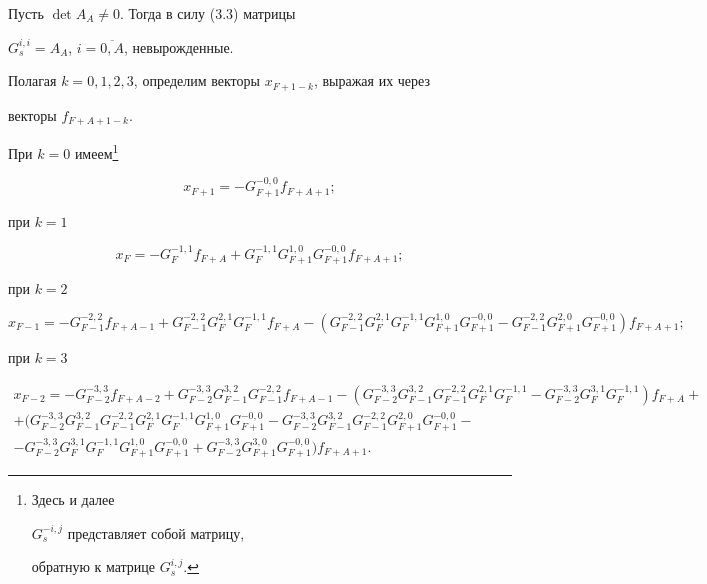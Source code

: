 Пусть $\det A_{A} \neq 0$. Тогда в силу (3.3) матрицы


$G_{s}^{i,i}=A_A$, $i=\overline{0,A}$, невырожденные.


Полагая $k=0,1,2,3$, определим векторы $x_{F+1-k}$, выражая их через


векторы $f_{F+A+1-k}$.





\noindent При $k=0$ имеем\footnote{Здесь и далее


$G_{s}^{-i,j}$ представляет собой матрицу,


обратную к матрице $G_{s}^{i,j}$.}


$$


x_{F+1}=-G_{F+1}^{-0,0}f_{F+A+1};


$$


при $k=1$


$$


x_{F}=-G_{F}^{-1,1}f_{F+A}+G_{F}^{-1,1}G_{F+1}^{1,0}


G_{F+1}^{-0,0}f_{F+A+1};


$$


при $k=2$


$$


x_{F-1}=-G_{F-1}^{-2,2}f_{F+A-1}+


G_{F-1}^{-2,2}G_{F}^{2,1}G_{F}^{-1,1}f_{F+A}-


(G_{F-1}^{-2,2}G_{F}^{2,1}G_{F}^{-1,1}G_{F+1}^{1,0}


G_{F+1}^{-0,0}-G_{F-1}^{-2,2}G_{F+1}^{2,0}G_{F+1}^{-0,0})f_{F+A+1};


$$


при $k=3$


\begin{multline*}


x_{F-2}=-G_{F-2}^{-3,3}f_{F+A-2}+G_{F-2}^{-3,3}G_{F-1}^{3,2}


G_{F-1}^{-2,2}f_{F+A-1}-


(G_{F-2}^{-3,3}G_{F-1}^{3,2}G_{F-1}^{-2,2}G_{F}^{2,1}


G_{F}^{-1,1}-G_{F-2}^{-3,3}G_{F}^{3,1}G_{F}^{-1,1})f_{F+A}+\\


%


+(G_{F-2}^{-3,3}G_{F-1}^{3,2}G_{F-1}^{-2,2}G_{F}^{2,1}


G_{F}^{-1,1}G_{F+1}^{1,0}G_{F+1}^{-0,0}-


G_{F-2}^{-3,3}G_{F-1}^{3,2}G_{F-1}^{-2,2}G_{F+1}^{2,0}G_{F+1}^{-0,0}-\\


%


-G_{F-2}^{-3,3}G_{F}^{3,1}G_{F}^{-1,1}G_{F+1}^{1,0}G_{F+1}^{-0,0}+


G_{F-2}^{-3,3}G_{F+1}^{3,0}G_{F+1}^{-0,0})f_{F+A+1}.


\end{multline*}





